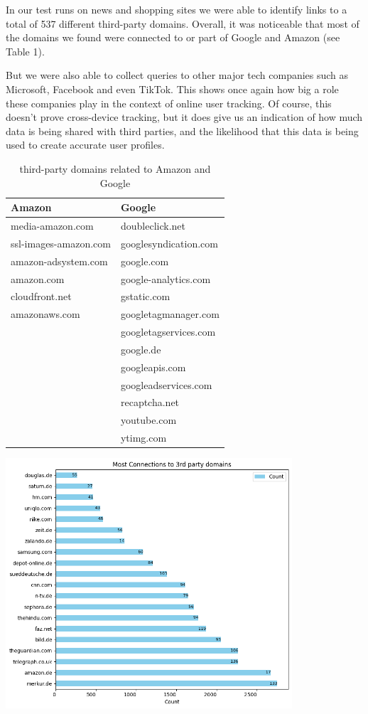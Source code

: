 In our test runs on news and shopping sites we were able to identify links to a total of 537 different third-party domains. Overall, it was noticeable that most of the domains we found were connected to or part of Google and Amazon (see Table 1).

But we were also able to collect queries to other major tech companies such as Microsoft, Facebook and even TikTok. This shows once again how big a role these companies play in the context of online user tracking. Of course, this doesn't prove cross-device tracking, but it does give us an indication of how much data is being shared with third parties, and the likelihood that this data is being used to create accurate user profiles.

\begin{table}[ht]
\small
\centering
\begin{tabularx}{0.6\textwidth}{|X|X|}
\hline
\textbf{Amazon} & \textbf{Google} \\
\hline
media-amazon.com & doubleclick.net \\
ssl-images-amazon.com & googlesyndication.com \\
amazon-adsystem.com & google.com \\
amazon.com & google-analytics.com \\
cloudfront.net & gstatic.com \\
amazonaws.com & googletagmanager.com \\
 & googletagservices.com \\
 & google.de \\
 & googleapis.com \\
 & googleadservices.com \\
 & recaptcha.net \\
 & youtube.com \\
 & ytimg.com \\
\hline
\end{tabularx}
\caption{third-party domains related to Amazon and Google}
\label{tab:third-party-domains}
\end{table}

\vspace{0.5cm}
\includegraphics[width=0.8\textwidth]{./assets/mostConnectionsToThirdPartyDomains.png}
\vspace{0.5cm}

